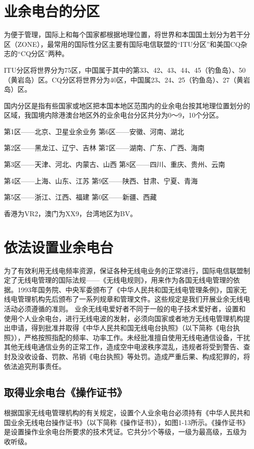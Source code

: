 \documentclass[12pt,UTF8]{ctexbook}
\begin{document}
\section{业余电台的分区}

为便于管理，国际上和每个国家都根据地理位置，将世界和本国国土划分为若干分区（ZONE），最常用的国际性分区主要有国际电信联盟的“ITU分区”和美国CQ杂志的“CQ分区”两种。

ITU分区将世界分为75区，中国属于其中的第33、42、43、44、45（钓鱼岛）、50（黄岩岛）区。CQ分区将世界分为40区，中国属23、24、25（钓鱼岛）、27（黄岩岛）区。

国内分区是指有些国家或地区把本国本地区范围内的业余电台按其地理位置划分的区域，我国境内除港澳台地区外的业余电台分区共分为0～9，10个分区。

第1区——北京、卫星业余业务 第6区——安徽、河南、湖北

第2区——黑龙江、辽宁、吉林 第7区——湖南、广东、广西、海南

第3区——天津、河北、内蒙古、山西 第8区——四川、重庆、贵州、云南

第4区——上海、山东、江苏 第9区——陕西、甘肃、宁夏、青海

第5区——浙江、江西、福建 第0区——新疆、西藏

香港为VR2，澳门为XX9，台湾地区为BV。


\section{依法设置业余电台}

为了有效利用无线电频率资源，保证各种无线电业务的正常进行，国际电信联盟制定了无线电管理的国际法规——《无线电规则》，用来作为各国无线电管理的依据。1993年国务院、中央军委颁布了《中华人民共和国无线电管理条例》，国家无线电管理机构先后颁布了一系列规章和管理文件。这些规定是我们开展业余无线电活动必须遵循的准则。
业余无线电爱好者不同于一般的电子技术爱好者，设置和使用个人业余电台，进行无线电波的发射，必须向国家或者地方无线电管理机构提出申请，得到批准并取得《中华人民共和国无线电台执照》（以下简称《电台执照》），严格按照指配的频率、功率工作。未经批准擅自使用无线电通信设备，干扰其他无线电通信业务的正常工作，造成空中电波秩序混乱，违规者将受到警告、查封及没收设备、罚款、吊销《电台执照》等处罚。造成严重后果、构成犯罪的，将依法追究刑事责任。

\subsection{取得业余电台《操作证书》}

根据国家无线电管理机构的有关规定，设置个人业余电台必须持有《中华人民共和国业余无线电台操作证书》（以下简称《操作证书》），如图1-13所示。《操作证书》是设置操作业余电台所要求的技术凭证。它共分5个等级，一级为最高级，五级为收听级。
\end{document}
